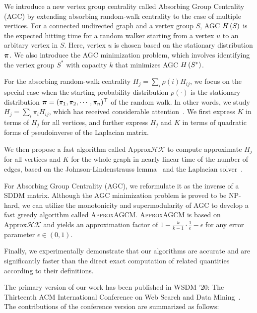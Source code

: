 \documentclass[10pt,journal,compsoc,twocolumn,twoside]{IEEEtran}
\begin{document}
We introduce a new vertex group centrality called Absorbing Group Centrality (AGC) by extending absorbing random-walk centrality to the case of multiple vertices.
For a connected undirected graph and a vertex group \(S\), AGC \(H\left(S\right)\) is the expected hitting time for a random walker starting from a vertex \(u\) to an arbitary vertex in \(S\). Here, vertex \(u\) is chosen based on the stationary distribution \(\boldsymbol{\pi}\).
We also introduce the AGC minimization problem, which involves identifying the vertex group \(S^*\) with capacity \(k\) that minimizes AGC \(H\left(S^*\right)\).

For the absorbing random-walk centrality \(H_j=\sum_{i} \rho(i) H_{ij}\), we focus on the special case when the starting probability distribution \(\rho(\cdot)\) is the stationary distribution \(\boldsymbol{\pi}=(\pi_1, \pi_2, \cdots, \pi_n)^{\top}\) of the random walk.
In other words, we study \(H_j=\sum_{i} \pi_i H_{ij}\), which has received considerable attention~\cite{TeBeVo09,Be09,Be16}.
We first express \(K\) in terms of \(H_j\) for all vertices, and further express \(H_j\) and \(K\) in terms of quadratic forms of pseudoinverse of the Laplacian matrix.

We then propose a fast algorithm called \(\text{Approx}\mathcal{HK}\) to compute approximate \(H_j\) for all vertices and \(K\) for the whole graph in nearly linear time of the number of edges, based on the Johnson-Lindenstrauss lemma~\cite{Ac01} and the Laplacian solver~\cite{SpTe04,Sp10,KoMiPe11,LiBr12,CoKyMiPaPeRaSu14,KySa16,GaKySp23}.

For Absorbing Group Centrality (AGC), we reformulate it as the inverse of a SDDM matrix.
Although the AGC minimization problem is proved to be NP-hard, we can utilize the monotonicity and supermodularity of AGC to develop a fast greedy algorithm called \textsc{ApproxAGCM}.
\textsc{ApproxAGCM} is based on \(\text{Approx}\mathcal{HK}\) and yields an approximation factor of \(1-\frac{k}{k-1}\cdot\frac{1}{e}-\epsilon\) for any error parameter \(\epsilon\in(0,1)\).

Finally, we experimentally demonstrate that our algorithms are accurate and are significantly faster than the direct exact computation of related quantities according to their definitions.

The primary version of our work has been published in WSDM '20: The Thirteenth ACM International Conference on Web Search and Data Mining~\cite{ZhXuZh20}. The contributions of the conference version are summarized as follows:
\end{document}
